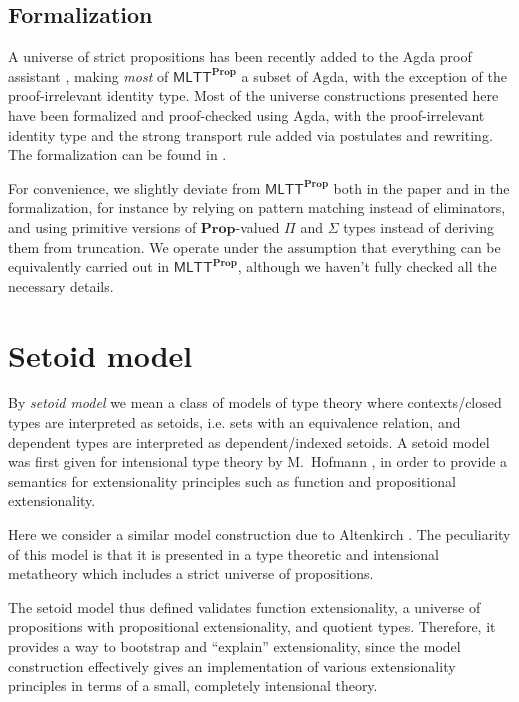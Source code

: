\documentclass[a4paper,UKenglish,cleveref, autoref, thm-restate]{lipics-v2019}
\newcommand{\mlttp}{\textsf{MLTT}^{\mProp}}
\newcommand{\mProp}{\mathbf{Prop}}
\begin{document}
\subsection{Formalization}

A universe of strict propositions has been recently added to the Agda proof
assistant \cite{agda-prop}, making \emph{most} of $\mlttp$ a subset of Agda,
with the exception of the proof-irrelevant identity type. Most of the universe
constructions presented here have been formalized and proof-checked using Agda,
with the proof-irrelevant identity type and the strong transport rule added via
postulates and rewriting. The formalization can be found in \cite{agda-code}.

For convenience, we slightly deviate from $\mlttp$ both in the paper and in the
formalization, for instance by relying on pattern matching instead of
eliminators, and using primitive versions of $\mProp$-valued $\Pi$ and $\Sigma$
types instead of deriving them from truncation. We operate under the assumption
that everything can be equivalently carried out in $\mlttp$, although we haven't
fully checked all the necessary details.

\section{Setoid model}\label{sec:setoid-model}

By \emph{setoid model} we mean a class of models of type theory where
contexts/closed types are interpreted as setoids, i.e. sets with an equivalence
relation, and dependent types are interpreted as dependent/indexed setoids.
%
A setoid model was first given for intensional type theory by M.\ Hofmann
\cite{hofmann}, in order to provide a semantics for extensionality principles such
as function and propositional extensionality.

Here we consider a similar model construction due to Altenkirch
\cite{setoid99}. The peculiarity of this model is that it is presented in a type
theoretic and intensional metatheory which includes a strict universe of
propositions.

The setoid model thus defined validates function extensionality, a universe of
propositions with propositional extensionality, and quotient types. Therefore,
it provides a way to bootstrap and ``explain'' extensionality, since the model
construction effectively gives an implementation of various extensionality
principles in terms of a small, completely intensional theory.
\end{document}
